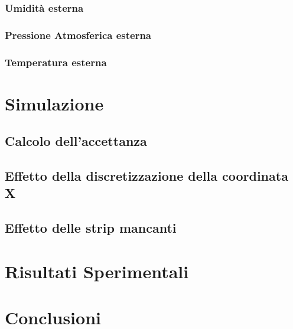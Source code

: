 \documentclass[8pt]{extarticle}
\begin{document}
\subsubsection{Umidità esterna}
\subsubsection{Pressione Atmosferica esterna}
\subsubsection{Temperatura esterna}

\section{Simulazione}
\subsection{Calcolo dell'accettanza}
\subsection{Effetto della discretizzazione della coordinata X}
\subsection{Effetto delle strip mancanti}

\section{Risultati Sperimentali}
\section{Conclusioni}


\end{document}
